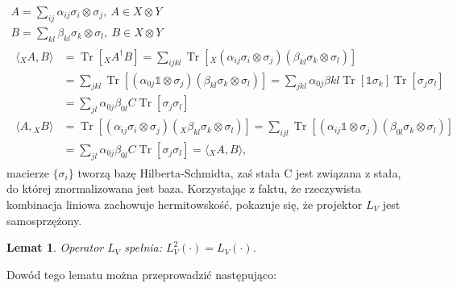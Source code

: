 \documentclass[10pt]{article} %
\newtheorem{lm}{Lemat}
\DeclareMathOperator{\Trs}{Tr}
\newcommand{\I}{\mathbb{1}}
\begin{document}
\begin{gather}
A =\sum_{ij} \alpha_{ij} \sigma_i \otimes \sigma_j ,~A \in X \otimes Y \\
B =\sum_{kl} \beta_{kl} \sigma_k \otimes \sigma_l,~B\in X\otimes Y\\
\begin{split}
\langle {}_X A, B \rangle &= \Trs \left[ {}_X A^\dag B\right] = \sum_{ijkl} \Trs\left[ {}_X (\alpha_{ij} \sigma_i \otimes \sigma_j) (\beta_{kl} \sigma_k \otimes \sigma_l)\right] \\
&= \sum_{jkl} \Trs \left[ (\alpha_{0j} \I \otimes \sigma_j) (\beta_{kl} \sigma_k \otimes \sigma_l) \right] = \sum_{jkl} \alpha_{0j} \beta{kl} \Trs \left[ \I \sigma_k\right] \Trs \left[ \sigma_j \sigma_l\right] \\
&= \sum_{jl} \alpha_{0j} \beta_{0l}C \Trs \left[ \sigma_j \sigma_l \right] \\
\langle A, {}_X B \rangle &=  \Trs\left[ (\alpha_{ij} \sigma_i \otimes \sigma_j) ( {}_X \beta_{kl} \sigma_k \otimes \sigma_l)\right] = \sum_{ijl} \Trs \left[ (\alpha_{ij} \I \otimes \sigma_j) (\beta_{0l} \sigma_k \otimes \sigma_l) \right] \\
&= \sum_{jl} \alpha_{0j} \beta_{0l}C \Trs \left[ \sigma_j \sigma_l \right] = \langle {}_X A, B \rangle,
\end{split}
\end{gather} macierze $\{ \sigma_i \}$ tworzą bazę Hilberta-Schmidta, zaś stała C jest związana z stała, do której znormalizowana jest baza. Korzystając z faktu, że rzeczywista kombinacja liniowa zachowuje hermitowskość, pokazuje się, że projektor $L_V$ jest samosprzężony. 
\begin{lm}
Operator $L_V$ spełnia: $L_V^2(\cdot) = L_V(\cdot)$.
\end{lm}
Dowód tego lematu można przeprowadzić następująco:
\end{document}

